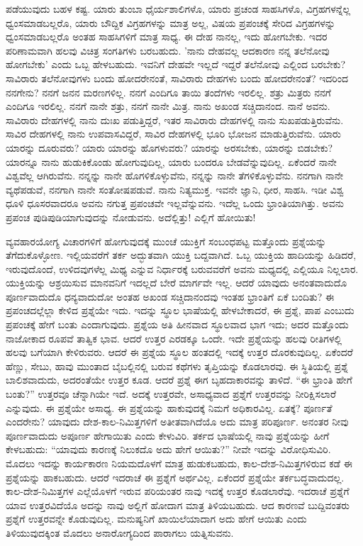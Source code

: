 ಪಡೆಯುವುದು ಬಹಳ ಕಷ್ಟ. ಯಾರು ತುಂಬಾ ಧೈರ್ಯಶಾಲಿಗಳೊ, ಯಾರು ಪ್ರಚಂಡ ಸಾಹಸಿಗಳೊ, ವಿಗ್ರಹಗಳನ್ನೆಲ್ಲ ಧ್ವಂಸಮಾಡಬಲ್ಲರೊ, ಯಾರು ಬೌದ್ದಿಕ ವಿಗ್ರಹಗಳನ್ನು ಮಾತ್ರ ಅಲ್ಲ, ವಿಷಯ ಪ್ರಪಂಚಕ್ಕೆ ಸೇರಿದ ವಿಗ್ರಹಗಳನ್ನು ಧ್ವಂಸಮಾಡಬಲ್ಲರೊ ಅಂತಹ ಸಾಹಸಿಗಳಿಗೆ ಮಾತ್ರ ಸಾಧ್ಯ. ಈ ದೇಹ ನಾನಲ್ಲ, ಇದು ಹೋಗಬೇಕು. ಇದರ ಪರಿಣಾಮವಾಗಿ ಹಲವು ವಿಚಿತ್ರ ಸಂಗತಿಗಳು ಬರಬಹುದು. 'ನಾನು ದೇಹವಲ್ಲ ಆದಕಾರಣ ನನ್ನ ತಲೆನೋವು ಹೋಗಬೇಕು' ಎಂದು ಒಬ್ಬ ಹೇಳಬಹುದು. ಇವನಿಗೆ ದೇಹವೇ ಇಲ್ಲದೆ ಇದ್ದರೆ ತಲೆನೋವು ಎಲ್ಲಿಂದ ಬರಬೇಕು? ಸಾವಿರಾರು ತಲೆನೋವುಗಳು ಬಂದು ಹೋದರೇನಂತೆ, ಸಾವಿರಾರು ದೇಹಗಳು ಬಂದು ಹೋದರೇನಂತೆ? ಇದರಿಂದ ನನಗೇನು? ನನಗೆ ಜನನ ಮರಣಗಳಿಲ್ಲ. ನನಗೆ ಎಂದಿಗೂ ತಾಯಿ ತಂದೆಗಳು ಇರಲಿಲ್ಲ. ಶತ್ರು ಮಿತ್ರರು ನನಗೆ ಎಂದಿಗೂ ಇರಲಿಲ್ಲ. ನನಗೆ ನಾನೇ ಶತ್ರು, ನನಗೆ ನಾನೇ ಮಿತ್ರ. ನಾನು ಅಖಂಡ ಸಚ್ಚಿದಾನಂದ. ನಾನೆ ಅವನು. ಸಾವಿರಾರು ದೇಹಗಳಲ್ಲಿ ನಾನು ದುಃಖ ಪಡುತ್ತಿದ್ದರೆ, ಇತರ ಸಾವಿರಾರು ದೇಹಗಳಲ್ಲಿ ನಾನು ಸುಖಪಡುತ್ತಿರುವೆನು. ಸಾವಿರ ದೇಹಗಳಲ್ಲಿ ನಾನು ಉಪವಾಸವಿದ್ದರೆ, ಸಾವಿರ ದೇಹಗಳಲ್ಲಿ ಭೂರಿ ಭೋಜನ ಮಾಡುತ್ತಿರುವೆನು. ಯಾರು ಯಾರನ್ನು ದೂರುವರು? ಯಾರು ಯಾರನ್ನು ಹೊಗಳುವರು? ಯಾರನ್ನು ಅರಸಬೇಕು, ಯಾರನ್ನು ಬಿಡಬೇಕು? ಯಾರನ್ನೂ ನಾನು ಹುಡುಕಿಕೊಂಡು ಹೋಗುವುದಿಲ್ಲ, ಯಾರು ಬಂದರೂ ಬೇಡವೆನ್ನುವುದಿಲ್ಲ. ಏಕೆಂದರೆ ನಾನೇ ವಿಶ್ವವೆಲ್ಲ ಆಗಿರುವೆನು. ನನ್ನನ್ನು ನಾನೇ ಹೊಗಳಿಕೊಳ್ಳುವೆನು, ನನ್ನನ್ನು ನಾನೇ ತೆಗಳಿಕೊಳ್ಳುವೆನು. ನನಗಾಗಿ ನಾನೇ ವ್ಯಥೆಪಡುವೆ, ನನಗಾಗಿ ನಾನೇ ಸಂತೋಷಪಡುವೆ. ನಾನು ನಿತ್ಯಮುಕ್ತ. ಇವನೇ ಜ್ಞಾನಿ, ಧೀರ, ಸಾಹಸಿ. ಇಡೀ ವಿಶ್ವ ಧೂಳಿ ಧೂಸರವಾದರೂ ಅವನು ನಗುತ್ತ ಪ್ರಪಂಚವೇ ಇಲ್ಲವೆನ್ನುವನು. ಇದೆಲ್ಲ ಒಂದು ಭ್ರಾಂತಿಯಾಗಿತ್ತು. ಅವನು ಪ್ರಪಂಚ ಪುಡಿಪುಡಿಯಾಗುವುದನ್ನು ನೋಡುವನು. ಅದೆಲ್ಲಿತ್ತು! ಎಲ್ಲಿಗೆ ಹೋಯಿತು!

ವ್ಯವಹಾರಯೋಗ್ಯ ವಿಚಾರಗಳಿಗೆ ಹೋಗುವುದಕ್ಕೆ ಮುಂಚೆ ಯುಕ್ತಿಗೆ ಸಂಬಂಧಪಟ್ಟ ಮತ್ತೊಂದು ಪ್ರಶ್ನೆಯನ್ನು ತೆಗೆದುಕೊಳ್ಳೋಣ. ಇಲ್ಲಿಯವರೆಗೆ ತರ್ಕ ಅದ್ಭುತವಾಗಿ ಯುಕ್ತಿ ಬದ್ದವಾಗಿದೆ. ಒಬ್ಬ ಯುಕ್ತಿಯ ಹಾದಿಯನ್ನು ಹಿಡಿದರೆ, ಇರುವುದೊಂದೆ, ಉಳಿದವುಗಳೆಲ್ಲ ಮಿಥ್ಯ ಎನ್ನುವ ನಿರ್ಧಾರಕ್ಕೆ ಬರುವವರೆಗೆ ಅವನು ಮಧ್ಯದಲ್ಲಿ ಎಲ್ಲಿಯೂ ನಿಲ್ಲಲಾರ. ಯುಕ್ತಿಯನ್ನು ಆಶ್ರಯಿಸುವ ಮಾನವನಿಗೆ ಇದಲ್ಲದೆ ಬೇರೆ ಮಾರ್ಗವೇ ಇಲ್ಲ. ಆದರೆ ಯಾವುದು ಅನಂತವಾದುದೊ ಪೂರ್ಣವಾದುದೊ ಧನ್ಯವಾದುದೋ ಅಂತಹ ಅಖಂಡ ಸಚ್ಚಿದಾನಂದವು ಇಂತಹ ಭ್ರಾಂತಿಗೆ ಏಕೆ ಬಂದಿತು? ಈ ಪ್ರಪಂಚದಲ್ಲೆಲ್ಲಾ ಕೇಳಿದ ಪ್ರಶ್ನೆಯೇ ಇದು. ಇದನ್ನು ಸ್ಥೂಲ ಭಾಷೆಯಲ್ಲಿ ಹೇಳಬೇಕಾದರೆ, ಈ ಪ್ರಶ್ನೆ, ಪಾಪ ಎಂಬುದು ಪ್ರಪಂಚಕ್ಕೆ ಹೇಗೆ ಬಂತು ಎಂದಾಗುವುದು. ಪ್ರಶ್ನೆಯ ಅತಿ ಹೀನವಾದ ಸ್ಥೂಲವಾದ ಭಾಗ ಇದು; ಅದರ ಮತ್ತೊಂದು ನಾಜೋಕಾದ ರೂಪವೆ ತಾತ್ವಿಕ ಭಾವ. ಆದರೆ ಉತ್ತರ ಎರಡಕ್ಕೂ ಒಂದೇ. ಇದೇ ಪ್ರಶ್ನೆಯನ್ನು ಹಲವು ರೀತಿಗಳಲ್ಲಿ ಹಲವು ಬಗೆಯಾಗಿ ಕೇಳಿರುವರು. ಆದರೆ ಈ ಪ್ರಶ್ನೆಯ ಸ್ಥೂಲ ಹಂತದಲ್ಲಿ ಇದಕ್ಕೆ ಉತ್ತರ ದೊರಕುವುದಿಲ್ಲ. ಏಕೆಂದರೆ ಹೆಣ್ಣು, ಸೇಬು, ಹಾವು ಮುಂತಾದ ಬೈಬಲ್ಲಿನಲ್ಲಿ ಬರುವ ಕಥೆಗಳು ತೃಪ್ತಿಯನ್ನು ಕೊಡಲಾರವು. ಈ ಸ್ಥಿತಿಯಲ್ಲಿ ಪ್ರಶ್ನೆ ಬಾಲಿಶವಾದುದು, ಅದರಂತೆಯೇ ಉತ್ತರ ಕೂಡ. ಆದರೆ ಪ್ರಶ್ನೆ ಈಗ ಬೃಹದಾಕಾರವನ್ನು ತಾಳಿದೆ. “ಈ ಭ್ರಾಂತಿ ಹೇಗೆ ಬಂತು?'' ಉತ್ತರವೂ ಚೆನ್ನಾಗಿಯೇ ಇದೆ. ಅದಕ್ಕೆ ಉತ್ತರವೇ, ಅಸಾಧ್ಯವಾದ ಪ್ರಶ್ನೆಗೆ ಉತ್ತರವನ್ನು ನೀರಿಕ್ಷಿಸಲಾರೆ ಎನ್ನುವುದು. ಈ ಪ್ರಶ್ನೆಯೇ ಅಸಾಧ್ಯ. ಈ ಪ್ರಶ್ನೆಯನ್ನು ಹಾಕುವುದಕ್ಕೆ ನಿಮಗೆ ಅಧಿಕಾರವಿಲ್ಲ. ಏತಕ್ಕೆ? ಪೂರ್ಣತೆ ಎಂದರೇನು? ಯಾವುದು ದೇಶ-ಕಾಲ-ನಿಮಿತ್ತಗಳಿಗೆ ಅತೀತವಾಗಿದೆಯೊ ಅದು ಮಾತ್ರ ಪರಿಪೂರ್ಣ. ಅನಂತರ ನೀವು ಪೂರ್ಣವಾದುದು ಅಪೂರ್ಣ ಹೇಗಾಯಿತು ಎಂದು ಕೇಳುವಿರಿ. ತರ್ಕದ ಭಾಷೆಯಲ್ಲಿ ನಾವು ಪ್ರಶ್ನೆಯನ್ನು ಹೀಗೆ ಕೇಳಬಹುದು: “ಯಾವುದು ಕಾರಣಕ್ಕೆ ನಿಲುಕದೊ ಅದು ಹೇಗೆ ಆಯಿತು?'' ನೀವೇ ಇದನ್ನು ವಿರೋಧಿಸುವಿರಿ. ಮೊದಲು ಇದನ್ನು ಕಾರ್ಯಕಾರಣ ನಿಯಮದೊಳಗೆ ಮಾತ್ರ ಹುಡುಕಬಹುದು, ಕಾಲ-ದೇಶ-ನಿಮಿತ್ತಗಳಿರುವ ಕಡೆ ಈ ಪ್ರಶ್ನೆಯನ್ನು ಹಾಕಬಹುದು. ಆದರೆ ಇದರಾಚೆ ಈ ಪ್ರಶ್ನೆಗೆ ಅರ್ಥವಿಲ್ಲ. ಏಕೆಂದರೆ ಪ್ರಶ್ನೆಯೇ ತರ್ಕಬದ್ಧವಾದುದಲ್ಲ. ಕಾಲ-ದೇಶ-ನಿಮಿತ್ತಗಳ ಎಲ್ಲೆಯೊಳಗೆ ಇರುವ ಪರಿಯಂತರ ನಾವು ಇದಕ್ಕೆ ಉತ್ತರ ಕೊಡಲಾರೆವು. ಇದರಾಚೆ ಪ್ರಶ್ನೆಗೆ ಯಾವ ಉತ್ತರವಿದೆಯೊ ಅದನ್ನು ನಾವು ಅಲ್ಲಿಗೆ ಹೋದಾಗ ಮಾತ್ರ ತಿಳಿಯಬಹುದು. ಆದ ಕಾರಣವೆ ಬುದ್ದಿವಂತರು ಪ್ರಶ್ನೆಗೆ ಉತ್ತರವನ್ನೇ ಕೊಡುವುದಿಲ್ಲ. ಮನುಷ್ಯನಿಗೆ ಖಾಯಿಲೆಯಾದಾಗ ಅದು ಹೇಗೆ ಆಯಿತು ಎಂದು ತಿಳಿಯುವುದಕ್ಕಿಂತ ಮೊದಲು ಅನಾರೋಗ್ಯದಿಂದ ಪಾರಾಗಲು ಯತ್ನಿಸುವನು.

